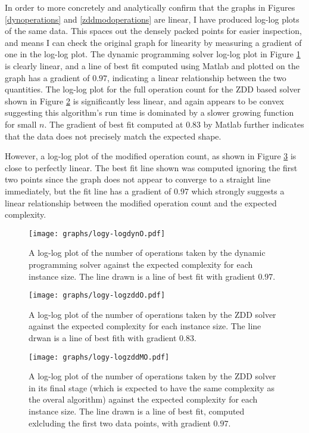 \documentclass[12pt,a4paper,twoside,openright]{report}
\begin{document}
In order to more concretely and analytically confirm that the graphs in Figures \ref{dynoperations} and \ref{zddmodoperations} are linear, I have produced log-log plots of the same data. This spaces out the densely packed points for easier inspection, and means I can check the original graph for linearity by measuring a gradient of one in the log-log plot. The dynamic programming solver log-log plot in Figure \ref{logdynoperations} is clearly linear, and a line of best fit computed using Matlab and plotted on the graph has a gradient of $0.97$, indicating a linear relationship between the two quantities. The log-log plot for the full operation count for the ZDD based solver shown in Figure \ref{logzddoperations} is significantly less linear, and again appears to be convex suggesting this algorithm's run time is dominated by a slower growing function for small $n$. The gradient of best fit computed at $0.83$ by Matlab further indicates that the data does not precisely match the expected shape.

However, a log-log plot of the modified operation count, as shown in Figure \ref{logzddmodoperations} is close to perfectly linear. The best fit line shown was computed ignoring the first two points since the graph does not appear to converge to a straight line immediately, but the fit line has a gradient of $0.97$ which strongly suggests a linear relationship between the modified operation count and the expected complexity.

\begin{figure}[ht]
\centering
\texttt{[image: graphs/logy-logdynO.pdf]}
\caption{A log-log plot of the number of operations taken by the dynamic programming solver against the expected complexity for each instance size. The line drawn is a line of best fit with gradient $0.97$.}
\label{logdynoperations}
\end{figure}

\begin{figure}[ht]
\centering
\texttt{[image: graphs/logy-logzddO.pdf]}
\caption{A log-log plot of the number of operations taken by the ZDD solver against the expected complexity for each instance size. The line drwan is a line of best fith with gradient $0.83$.}
\label{logzddoperations}
\end{figure}

\begin{figure}[ht]
\centering
\texttt{[image: graphs/logy-logzddMO.pdf]}
\caption{A log-log plot of the number of operations taken by the ZDD solver in its final stage (which is expected to have the same complexity as the overal algorithm) against the expected complexity for each instance size. The line drawn is a line of best fit, computed exlcluding the first two data points, with gradient $0.97$.}
\label{logzddmodoperations}
\end{figure}
\end{document}
